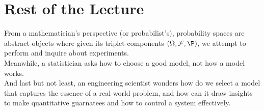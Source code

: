 \section{Rest of the Lecture}
From a mathematician's perspective (or probabilist's), probability spaces are abstract objects where given its triplet components $(\Omega, \mathcal{F}, \P)$, we attempt to perform and inquire about experiments. \\
Meanwhile, a statistician asks how to choose a good model, not how a model works. \\
And last but not least, an engineering scientist wonders how do we select a model that captures the essence of a real-world problem, and how can it draw insights to make quantitative guarnatees and how to control a system effectively.
